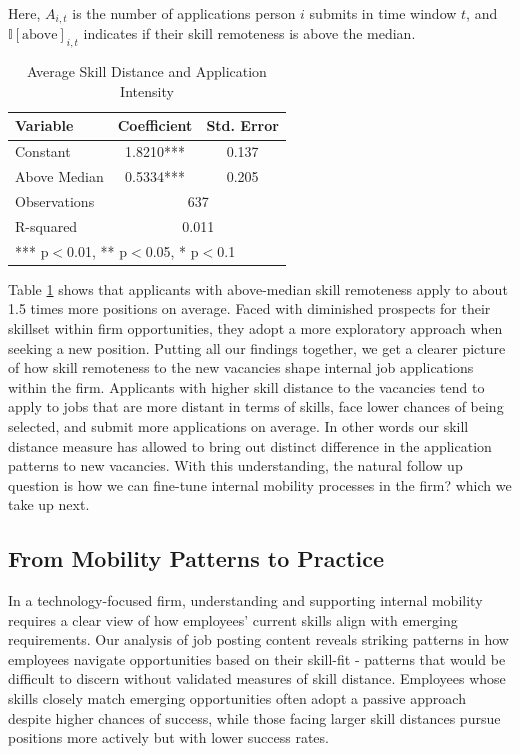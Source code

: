 Here, $A_{i,t}$ is the number of applications person $i$ submits in time window $t$, 
and $\mathbb{I}[\text{above}]_{i,t}$ indicates if their skill remoteness is above the median.


\begin{table}[h]
\centering
\caption{Average Skill Distance and Application Intensity}
\renewcommand{\arraystretch}{1.2} %
\begin{tabular}{lcc}
\hline
\textbf{Variable} & \textbf{Coefficient} & \textbf{Std. Error} \\
\hline
Constant & 1.8210*** & 0.137 \\
Above Median & 0.5334*** & 0.205 \\
\hline
Observations & \multicolumn{2}{c}{637} \\
R-squared & \multicolumn{2}{c}{0.011} \\
\hline
\multicolumn{3}{l}{\small{*** p$<$0.01, ** p$<$0.05, * p$<$0.1}} \\
\end{tabular}
\label{tab:skill_remote_intensity} 
\end{table}


Table \ref{tab:skill_remote_intensity} shows that applicants with above-median skill remoteness apply to about 1.5 
times more positions on average. Faced with diminished prospects for their skillset within firm opportunities, 
they adopt a more exploratory approach when seeking a new position. Putting all our findings together, we get a 
clearer picture of how skill remoteness to the new vacancies shape internal job applications within the firm. 
Applicants with higher skill distance to the vacancies tend to apply to jobs that are more distant in terms of skills, 
face lower chances of being selected, and submit more applications on average. In other words our skill distance measure 
has allowed to bring out distinct difference in the application patterns to new vacancies. With this understanding, 
the natural follow up question is how we can fine-tune internal mobility processes in the firm? which we take up next.




\subsection{From Mobility Patterns to Practice}

In a technology-focused firm, understanding and supporting internal mobility requires a clear view of how employees' 
current skills align with emerging requirements. Our analysis of job posting content reveals striking patterns in 
how employees navigate opportunities based on their skill-fit - patterns that would be difficult to discern without 
validated measures of skill distance. Employees whose skills closely match emerging opportunities often adopt a 
passive approach despite higher chances of success, while those facing larger skill distances pursue positions 
more actively but with lower success rates.

